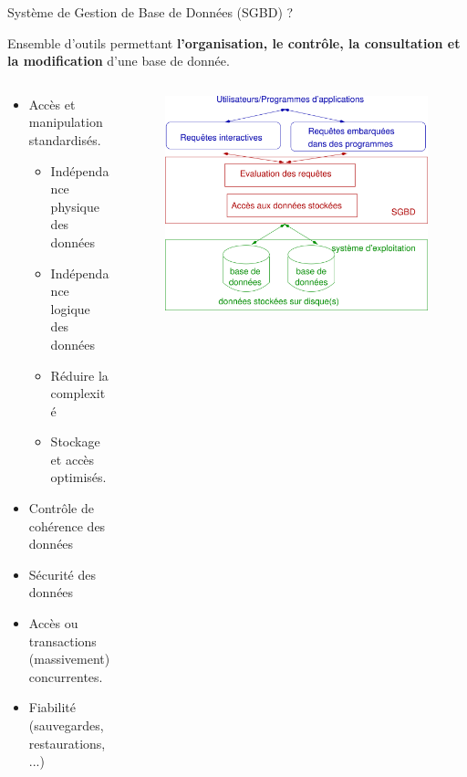 \documentclass[xetex,dvipsnames]{beamer}
\begin{document}
\begin{frame}[t]{Système de Gestion de Base de Données (SGBD) ?}
	     \begin{exampleblock}{}
	     	Ensemble d'outils permettant \textbf{l'organisation, le contrôle, la consultation et la modification} d'une base de donnée.
	     \end{exampleblock}
  \begin{columns}
	    \begin{column}{0.6\textwidth}
\begin{footnotesize}
	  	\begin{itemize}
	  		\item Accès et manipulation standardisés.
		 	\begin{itemize}
		 	\item Indépendance physique des données
	  		\item Indépendance logique des données
	  		\item Réduire la complexité
	 		\item Stockage et accès optimisés.
		 	\end{itemize}
		 	\item Contrôle de cohérence des données
		 	\item Sécurité des données
		 	\item Accès ou transactions (massivement) concurrentes.
		 	\item Fiabilité (sauvegardes, restaurations, ...)
		 	\end{itemize}
\end{footnotesize}
		\end{column}
		\begin{column}{0.4\textwidth}
		\begin{figure} \begin{center}\includegraphics[width=0.99\textwidth]{./figures/SGBDR.png}\end{center}\end{figure}
		\end{column}
	\end{columns}
\end{frame}
\end{document}
